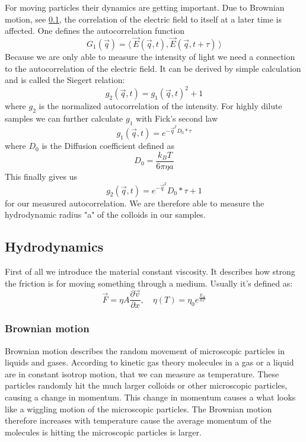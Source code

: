 \documentclass[]{article}
\begin{document}
For moving particles their dynamics are getting important. Due to Brownian motion, see \ref{hyd}, the correlation of the electric field to itself at a later time is affected. One defines the autocorrelation function 
\begin{equation}\label{eq:g1}
G_1(\vec{q}) = \langle \: \vec{E}(\vec{q},t),\vec{E}(\vec{q},t+\tau) \: \rangle
\end{equation} 
Because we are only able to measure the intensity of light we need a connection to the autocorrelation of the electric field. It can be derived by simple calculation and is called the Siegert relation:
\begin{equation}\label{eq:siegert}
g_2(\vec{q},t) = g_1(\vec{q},t )^2 +1
\end{equation}
where $g_2$ is the normalized autocorrelation of the intensity. For highly dilute samples we can further calculate $g_1$ with Fick's second law
\begin{equation}\label{eq:g1solved}
g_1(\vec{q},t )=e^{-\vec{q}^{2}D_0*\tau}
\end{equation}
where $D_0$ is the Diffusion coefficient defined as 
\begin{equation}\label{eq:StokesEinstein}
D_0=\frac{k_BT}{6\pi \eta a}
\end{equation}
This finally gives us 
\begin{equation}\label{eq:g2}
\boxed{g_2(\vec{q},t) =e^{- \vec{q}^{2}}D_0*\tau+1}
\end{equation}
for our measured autocorrelation. We are therefore able to measure the hydrodynamic radius "a" of the colloids in our samples.


\subsection{Hydrodynamics}
\label{hyd}
First of all we introduce the material constant viscosity. It describes how strong the friction is for moving something through a medium. Usually it's defined as: 
\begin{equation}
\vec{F}=\eta A \frac{\partial \vec{v}}{\partial x} , \quad \eta(T)= \eta_0 e^{\frac{E_A}{RT}}
\end{equation}
\subsubsection{Brownian motion}
Brownian motion describes the random movement of microscopic particles in liquids and gases. According to kinetic gas theory molecules in a gas or a liquid are in constant isotrop motion, that we can measure as temperature. These particles randomly hit the much larger colloids or other microscopic particles, causing a change in momentum. This change in momentum causes a what looks like a wiggling motion of the microscopic particles. The Brownian motion therefore increases with temperature cause the average momentum of the molecules is hitting the microscopic particles is larger.
\end{document}
